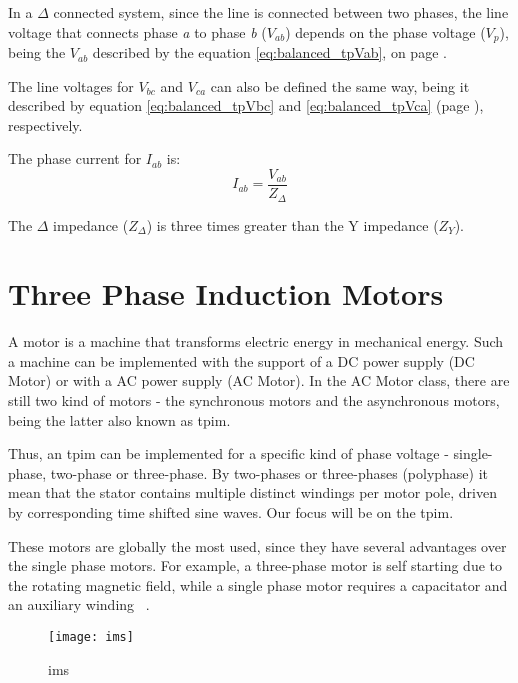 In a $\Delta$ connected system, since the line is connected between two phases, the line voltage that connects phase \emph{a} to phase \emph{b} ($V_{ab}$) depends on the phase voltage ($V_{p}$), being the $V_{ab}$ described by the equation \ref{eq:balanced_tpVab}, on page \pageref{eq:balanced_tpVab}.

The line voltages for $V_{bc}$ and $V_{ca}$ can also be defined the same way, being it described by equation \ref{eq:balanced_tpVbc} and \ref{eq:balanced_tpVca} (page \pageref{eq:balanced_tpVab}), respectively. 

The phase current for $I_{ab}$ is:
\begin{equation} \label{eq:balanced_tpIab}
	I_{ab} = \frac{V_{ab}}{Z_{\Delta}}
\end{equation}

The $\Delta$ impedance ($Z_{\Delta}$) is three times greater than the Y impedance ($Z_{Y}$).




\section{Three Phase Induction Motors} %
\label{sec:three_phase_induction_motors}

A motor is a machine that transforms electric energy in mechanical energy.
Such a machine can be implemented with the support of a DC power supply (DC Motor) or with a AC power supply (AC Motor).
In the AC Motor class, there are still two kind of motors - the synchronous motors and the asynchronous motors, being the latter also known as \acrfull{tpim}.


Thus, an \acrshort{tpim} can be implemented for a specific kind of phase voltage - single-phase, two-phase or three-phase.
By two-phases or three-phases (polyphase) it mean that the stator contains multiple distinct windings per motor pole, driven by corresponding time shifted sine waves.
Our focus will be on the \acrfull{tpim}.

These motors are  globally the most used, since they have several advantages over the single phase motors. For example, a three-phase motor is self starting due to the rotating magnetic field, while a single phase motor requires a capacitator and an auxiliary winding ~\cite{Ferreira1}.

\begin{figure}[htbp]
	\centering
	\texttt{[image: ims]}
	\caption{\Acrlong{ims}}
	\label{fig:ims}
\end{figure}

